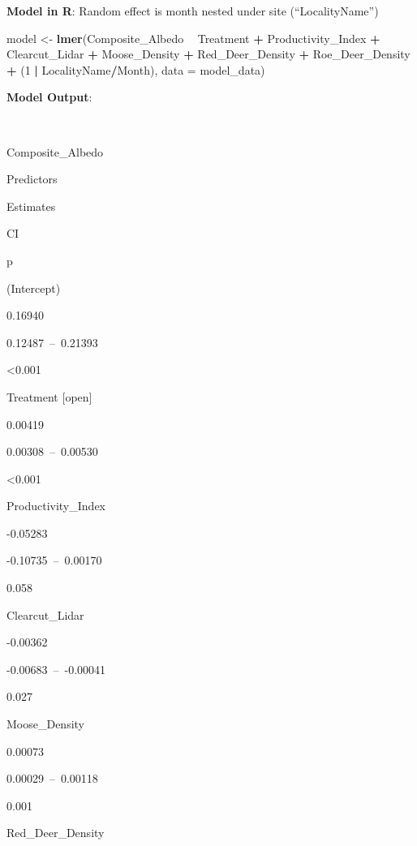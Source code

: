 \documentclass[]{article}
\newenvironment{Shaded}{\begin{snugshade}}{\end{snugshade}}
\newcommand{\KeywordTok}[1]{\textcolor[rgb]{0.13,0.29,0.53}{\textbf{#1}}}
\newcommand{\DataTypeTok}[1]{\textcolor[rgb]{0.13,0.29,0.53}{#1}}
\newcommand{\DecValTok}[1]{\textcolor[rgb]{0.00,0.00,0.81}{#1}}
\newcommand{\StringTok}[1]{\textcolor[rgb]{0.31,0.60,0.02}{#1}}
\newcommand{\OperatorTok}[1]{\textcolor[rgb]{0.81,0.36,0.00}{\textbf{#1}}}
\newcommand{\NormalTok}[1]{#1}
\begin{document}
\textbf{Model in R}: Random effect is month nested under site
(``LocalityName'')

\begin{Shaded}
\begin{Highlighting}[]
\NormalTok{model <-}\StringTok{ }\KeywordTok{lmer}\NormalTok{(Composite_Albedo }\OperatorTok{~}\StringTok{ }\NormalTok{Treatment }\OperatorTok{+}
\StringTok{                      }\NormalTok{Productivity_Index }\OperatorTok{+}
\StringTok{                      }\NormalTok{Clearcut_Lidar }\OperatorTok{+}
\StringTok{                      }\NormalTok{Moose_Density }\OperatorTok{+}
\StringTok{                      }\NormalTok{Red_Deer_Density }\OperatorTok{+}
\StringTok{                      }\NormalTok{Roe_Deer_Density }\OperatorTok{+}
\StringTok{                      }\NormalTok{(}\DecValTok{1} \OperatorTok{|}\StringTok{ }\NormalTok{LocalityName}\OperatorTok{/}\NormalTok{Month),}
              \DataTypeTok{data =}\NormalTok{ model_data)}
\end{Highlighting}
\end{Shaded}

\textbf{Model Output}:

~

Composite\_Albedo

Predictors

Estimates

CI

p

(Intercept)

0.16940

0.12487~--~0.21393

\textless{}0.001

Treatment {[}open{]}

0.00419

0.00308~--~0.00530

\textless{}0.001

Productivity\_Index

-0.05283

-0.10735~--~0.00170

0.058

Clearcut\_Lidar

-0.00362

-0.00683~--~-0.00041

0.027

Moose\_Density

0.00073

0.00029~--~0.00118

0.001

Red\_Deer\_Density
\end{document}
